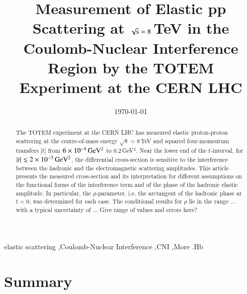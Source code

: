 \documentclass[3p,twocolumn]{elsarticle}
\def\todo#1{{\color{red} #1}}
\begin{document}
\begin{frontmatter}

\title{Measurement of Elastic pp Scattering at $\sqrt{\hbox{s}} = \hbox{8}$\,TeV in the 
Coulomb-Nuclear Interference Region by the TOTEM Experiment at the CERN LHC}



\date{\today}

\begin{abstract}
The TOTEM experiment at the CERN LHC has measured elastic proton-proton 
scattering at the centre-of-mass energy 
$\sqrt{s}=8\,$TeV and squared four-momentum transfers $|t|$ from $6\times10^{-4}\,\rm GeV^{2}$ to 0.2\,GeV$^{2}$.
Near the lower end of the $t$-interval, for
$|t| \lesssim 2\times10^{-3}\,\rm GeV^{2}$, the differential cross-section is 
sensitive to the 
interference between the hadronic and the electromagnetic scattering amplitudes.
This article presents the measured cross-section and its interpretation for 
different assumptions on the functional forms of the interference term and of 
the phase of the hadronic elastic amplitude. In 
particular, the $\rho$-parameter, i.e. 
the arctangent of the hadronic phase at $t = 0$,
was determined for each case. The conditional results for $\rho$ lie in the 
range ... with a typical uncertainty of ...
\todo{Give range of values and errors here?}
\end{abstract}

\begin{keyword}
elastic scattering \sep Coulomb-Nuclear Interference \sep CNI \sep More
.Hb %
\end{keyword}
\end{frontmatter}















\section{Summary}
\end{document}
